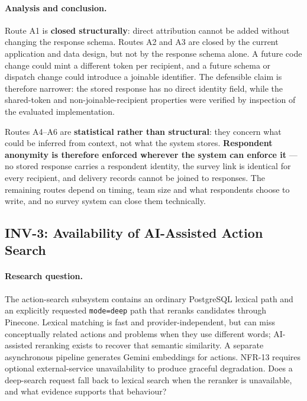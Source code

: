 \paragraph{Analysis and conclusion.} Route A1 is \textbf{closed structurally}:
direct attribution cannot be added without changing the response schema. Routes
A2 and A3 are closed by the current application and data design, but not by the
response schema alone. A future code change could mint a different token per
recipient, and a future schema or dispatch change could introduce a joinable
identifier. The defensible claim is therefore narrower: the stored response has
no direct identity field, while the shared-token and non-joinable-recipient
properties were verified by inspection of the evaluated implementation.

Routes A4--A6 are \textbf{statistical rather than structural}: they concern what
could be inferred from context, not what the system stores. \textbf{Respondent
anonymity is therefore enforced wherever the system can enforce it} --- no
stored response carries a respondent identity, the survey link is identical for
every recipient, and delivery records cannot be joined to responses. The
remaining routes depend on timing, team size and what respondents choose to
write, and no survey system can close them technically.

\subsection{INV-3: Availability of AI-Assisted Action Search}
\label{subsec:inv3}

\paragraph{Research question.} The action-search subsystem contains an ordinary
PostgreSQL lexical path and an explicitly requested \texttt{mode=deep} path that
reranks candidates through Pinecone. Lexical matching is fast and
provider-independent, but can miss conceptually related actions and problems
when they use different words; AI-assisted reranking exists to recover that
semantic similarity. A separate asynchronous pipeline generates Gemini
embeddings for actions. NFR-13 requires optional external-service
unavailability to produce graceful degradation. Does a deep-search request fall
back to lexical search when the reranker is unavailable, and what evidence
supports that behaviour?

